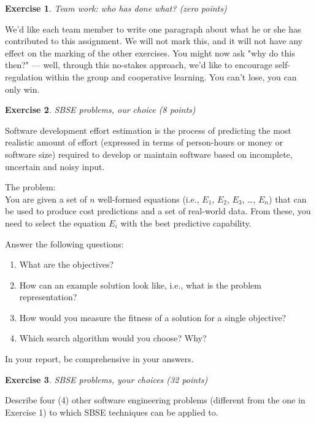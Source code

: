 \documentclass{pracs}
\newtheorem{exercise}{Exercise}
\begin{document}
\begin{exercise}
Team work: who has done what? (zero points)
\end{exercise}

We'd like each team member to write one paragraph about what he or she has contributed to this assignment. We will not mark this, and it will not have any effect on the marking of the other exercises. You might now ask "why do this then?" --- well, through this no-stakes approach, we'd like to encourage self-regulation within the group and cooperative learning. You can't lose, you can only win.



\begin{exercise}
SBSE problems, our choice (8 points)
\end{exercise}

Software development effort estimation is the process of predicting the most realistic amount of effort (expressed in terms of person-hours or money or software size) required to develop or maintain software based on incomplete, uncertain and noisy input. 

The problem:\\
You are given a set of $n$ well-formed equations (i.e., $E_1$, $E_2$, $E_3$, \ldots, $E_n$) that can be used to produce cost predictions and a set of real-world data. From these, you need to select the equation $E_i$ with the best predictive capability.

Answer the following questions:
\begin{enumerate}
\item What are the objectives?
\item How can an example solution look like, i.e., what is the problem representation?
\item How would you measure the fitness of a solution for a single objective?
\item Which search algorithm would you choose? Why?
\end{enumerate}

In your report, be comprehensive in your answers. 

\begin{exercise}
SBSE problems, your choices (32 points)
\end{exercise}

Describe four (4) other software engineering problems (different from the one in Exercise 1) to which SBSE techniques can be applied to. 
\end{document}
